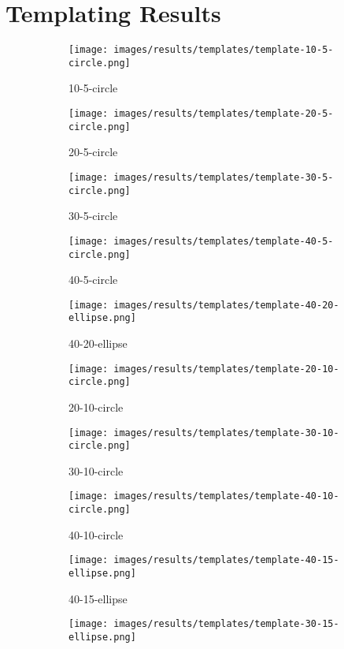 \section{Templating Results}


\begin{figure}[H]
    \centering

\begin{subfigure}{.25\textwidth}
    \centering
    \texttt{[image: images/results/templates/template-10-5-circle.png]}
    \caption{10-5-circle}
\end{subfigure}%
\begin{subfigure}{.25\textwidth}
\centering
    \texttt{[image: images/results/templates/template-20-5-circle.png]}
    \caption{20-5-circle}
\end{subfigure}%
\begin{subfigure}{.25\textwidth}
\centering
    \texttt{[image: images/results/templates/template-30-5-circle.png]}
    \caption{30-5-circle}
\end{subfigure}%
\begin{subfigure}{.25\textwidth}
\centering
    \texttt{[image: images/results/templates/template-40-5-circle.png]}
    \caption{40-5-circle}
\end{subfigure}
\begin{subfigure}{.25\textwidth}
\centering
    \texttt{[image: images/results/templates/template-40-20-ellipse.png]}
    \caption{40-20-ellipse}
\end{subfigure}%
\begin{subfigure}{.25\textwidth}
\centering
    \texttt{[image: images/results/templates/template-20-10-circle.png]}
    \caption{20-10-circle}
\end{subfigure}%
\begin{subfigure}{.25\textwidth}
\centering
    \texttt{[image: images/results/templates/template-30-10-circle.png]}
    \caption{30-10-circle}
\end{subfigure}%
\begin{subfigure}{.25\textwidth}
\centering
    \texttt{[image: images/results/templates/template-40-10-circle.png]}
    \caption{40-10-circle}
\end{subfigure}
\begin{subfigure}{.25\textwidth}
\centering
    \texttt{[image: images/results/templates/template-40-15-ellipse.png]}
    \caption{40-15-ellipse}
\end{subfigure}%
\begin{subfigure}{.25\textwidth}
\centering
    \texttt{[image: images/results/templates/template-30-15-ellipse.png]}

\end{subfigure}
\end{figure}

